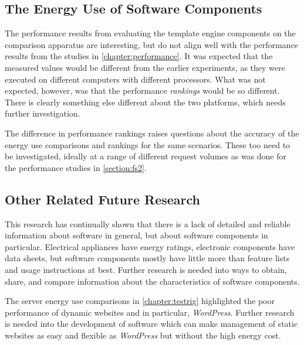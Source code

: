 \subsection{The Energy Use of Software Components}

The performance results from evaluating the template engine components on the comparison apparatus are interesting, but do not align well with the performance results from the studies in \autoref{chapter:performance}. It was expected that the measured values would be different from the earlier experiments, as they were executed on different computers with different processors. What was not expected, however, was that the performance \emph{rankings} would be so different. There is clearly something else different about the two platforms, which needs further investigation.

The difference in performance rankings raises questions about the accuracy of the energy use comparisons and rankings for the same scenarios. These too need to be investigated, ideally at a range of different request volumes as was done for the performance studies in \autoref{section:fs2}. 

\subsection{Other Related Future Research}

This research has continually shown that there is a lack of detailed and reliable information about software in general, but about software components in particular. Electrical appliances have energy ratings, electronic components have data sheets, but software components mostly have little more than feature lists and usage instructions at best. Further research is needed into ways to obtain, share, and compare information about the characteristics of software components.

The server energy use comparisons in \autoref{chapter:testrig} highlighted the poor performance of dynamic websites and in particular, \emph{WordPress}. Further research is needed into the development of software which can make management of static websites as easy and flexible as \emph{WordPress} but without the high energy cost.

